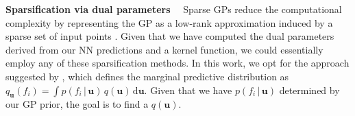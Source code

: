 \documentclass{article}
\renewcommand{\paragraph}[1]{{\bf #1}~~}
\newcommand{\mbf}[1]{\mathbf{#1}}
\renewcommand{\mid}{\,|\,}
\newcommand{\vu}{\mbf{u}}
\begin{document}
\paragraph{Sparsification via dual parameters}
\label{sec:sparse-dual-gp}
%
Sparse GPs reduce the computational complexity by representing the GP as a low-rank approximation induced by a sparse set of input points \citep[see][for an early overview]{quinonero2005unifying}. Given that we have computed the dual parameters derived from our NN predictions and a kernel function, we could essentially employ any of these sparsification methods. In this work, we opt for the approach suggested by \citet{titsias2009variational} \citep[also used in the DTC approximation, see][]{quinonero2005unifying}, which defines the marginal predictive distribution as $q_{\vu}(f_i)  = \int p(f_i  \mid \vu) \, q(\vu) \, \mathrm{d}\vu$. Given that we have $p(f_i \mid \vu)$ determined by our GP prior, the goal is to find a $q(\vu)$.
\end{document}
